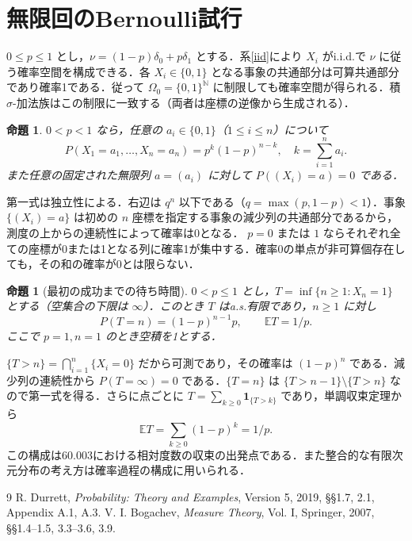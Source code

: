 \documentclass[a5paper,10pt,onecolumn]{jsarticle}
\makeatletter
\theoremstyle{mathnotetheorem}
\newtheorem{proposition}[theorem]{命題}
\renewcommand{\proofname}{証明}
\renewenvironment{proof}[1][\proofname]{%
  \par\pushQED{\qed}\normalfont\topsep4\p@\@plus2\p@\relax
  \trivlist\item[\hskip\labelsep\bfseries #1]\ignorespaces
}{\popQED\endtrivlist\@endpefalse}
\newcommand{\N}{\mathbb{N}}
\newcommand{\E}{\mathbb E}
\newcommand{\1}{\mathbf{1}}
\makeatother
\begin{document}
\section{無限回のBernoulli試行}
$0\le p\le1$ とし，$\nu=(1-p)\delta_0+p\delta_1$ とする．系\ref{iid}により $X_i$ がi.i.d.で $\nu$ に従う確率空間を構成できる．各 $X_i\in\{0,1\}$ となる事象の共通部分は可算共通部分であり確率1である．従って $\Omega_0=\{0,1\}^\N$ に制限しても確率空間が得られる．積 $\sigma$-加法族はこの制限に一致する（両者は座標の逆像から生成される）．
\begin{proposition}
$0<p<1$ なら，任意の $a_i\in\{0,1\}$（$1\le i\le n$）について
\[
 P(X_1=a_1,\ldots,X_n=a_n)=p^k(1-p)^{n-k},
 \quad k=\sum_{i=1}^na_i.
\]
また任意の固定された無限列 $a=(a_i)$ に対して $P((X_i)=a)=0$ である．
\end{proposition}
\begin{proof}
第一式は独立性による．右辺は $q^n$ 以下である（$q=\max(p,1-p)<1$）．事象 $\{(X_i)=a\}$ は初めの $n$ 座標を指定する事象の減少列の共通部分であるから，測度の上からの連続性によって確率は0となる．
\end{proof}
$p=0$ または $1$ ならそれぞれ全ての座標が0または1となる列に確率1が集中する．確率0の単点が非可算個存在しても，その和の確率が0とは限らない．
\begin{proposition}[最初の成功までの待ち時間]
$0<p\le1$ とし，$T=\inf\{n\ge1:X_n=1\}$ とする（空集合の下限は $\infty$）．このとき $T$ はa.s.有限であり，$n\ge1$ に対し
\[
 P(T=n)=(1-p)^{n-1}p,
 \qquad \E T=1/p.
\]
ここで $p=1,n=1$ のとき空積を1とする．
\end{proposition}
\begin{proof}
$\{T>n\}=\bigcap_{i=1}^n\{X_i=0\}$ だから可測であり，その確率は $(1-p)^n$ である．減少列の連続性から $P(T=\infty)=0$ である．$\{T=n\}$ は $\{T>n-1\}\setminus\{T>n\}$ なので第一式を得る．さらに点ごとに $T=\sum_{k\ge0}\1_{\{T>k\}}$ であり，単調収束定理から
\[
 \E T=\sum_{k\ge0}(1-p)^k=1/p.
\]
\end{proof}
この構成は60.003における相対度数の収束の出発点である．また整合的な有限次元分布の考え方は確率過程の構成に用いられる．
\begin{thebibliography}{9}
 R. Durrett, \textit{Probability: Theory and Examples}, Version 5, 2019, \S\S1.7, 2.1, Appendix A.1, A.3.
 V. I. Bogachev, \textit{Measure Theory}, Vol. I, Springer, 2007, \S\S1.4--1.5, 3.3--3.6, 3.9.
\end{thebibliography}
\end{document}
